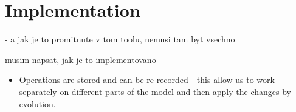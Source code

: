 \chapter{Implementation} - a jak je to promitnute v tom toolu, nemusi tam byt vsechno
\label{chapters:implementation}

musim napsat, jak je to implementovano

\begin{itemize}
    \item Operations are stored and can be re-recorded - this allow us to work separately on different parts of the model and then apply the changes by evolution.
\end{itemize}